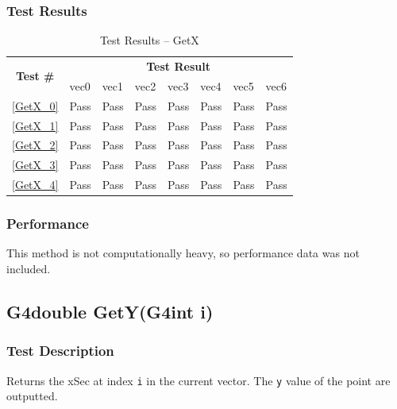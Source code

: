 \documentclass[12pt]{article}
\begin{document}
	\subsubsection{Test Results}
		\begin{table}[H]
		\centering
		\caption{Test Results -- GetX}\label{GetX_acc}
		\begin{tabular}{clllllll}
		\toprule
		\multirow{2}{*}{\bf Test \#} & \multicolumn{7}{c}{\bf Test Result}\\
		& vec0 & vec1 & vec2 & vec3 & vec4 & vec5 & vec6\\\midrule
		\ref{GetX_0} & Pass & Pass & Pass & Pass & Pass & Pass & Pass\\
		\ref{GetX_1} & Pass & Pass & Pass & Pass & Pass & Pass & Pass\\
		\ref{GetX_2} & Pass & Pass & Pass & Pass & Pass & Pass & Pass\\
		\ref{GetX_3} & Pass & Pass & Pass & Pass & Pass & Pass & Pass\\
		\ref{GetX_4} & Pass & Pass & Pass & Pass & Pass & Pass & Pass\\
		\bottomrule
		\end{tabular}
		\end{table}

	\subsubsection{Performance}
		This method is not computationally heavy, so performance data was not included.

\subsection{G4double GetY(G4int i)}

	\subsubsection{Test Description}
	Returns the xSec at index \texttt{i} in the current vector. The \texttt{y} 
	value of the point are outputted.
	
\end{document}
